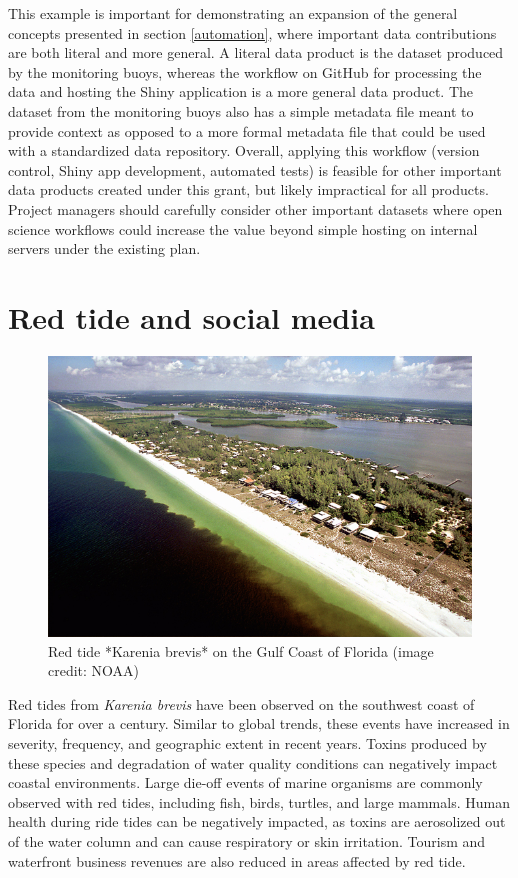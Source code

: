 \documentclass[
]{book}
\begin{document}
This example is important for demonstrating an expansion of the general concepts presented in section \ref{automation}, where important data contributions are both literal and more general. A literal data product is the dataset produced by the monitoring buoys, whereas the workflow on GitHub for processing the data and hosting the Shiny application is a more general data product. The dataset from the monitoring buoys also has a simple metadata file meant to provide context as opposed to a more formal metadata file that could be used with a standardized data repository. Overall, applying this workflow (version control, Shiny app development, automated tests) is feasible for other important data products created under this grant, but likely impractical for all products. Project managers should carefully consider other important datasets where open science workflows could increase the value beyond simple hosting on internal servers under the existing plan.

\hypertarget{twitter}{%
\section{Red tide and social media}\label{twitter}}

\begin{figure}

{\centering \includegraphics[width=0.8\linewidth]{img/red tide} 

}

\caption{Red tide *Karenia brevis* on the Gulf Coast of Florida (image credit: NOAA)}\label{fig:unnamed-chunk-14}
\end{figure}

Red tides from \emph{Karenia brevis} have been observed on the southwest coast of Florida for over a century. Similar to global trends, these events have increased in severity, frequency, and geographic extent in recent years. Toxins produced by these species and degradation of water quality conditions can negatively impact coastal environments. Large die-off events of marine organisms are commonly observed with red tides, including fish, birds, turtles, and large mammals. Human health during ride tides can be negatively impacted, as toxins are aerosolized out of the water column and can cause respiratory or skin irritation. Tourism and waterfront business revenues are also reduced in areas affected by red tide.
\end{document}
